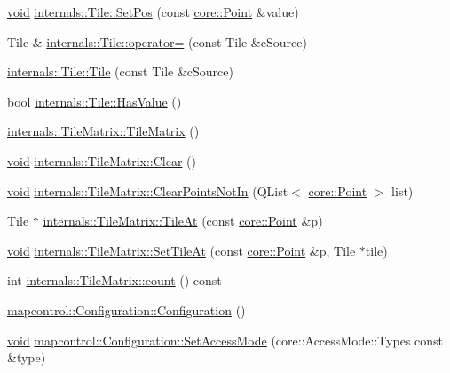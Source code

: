 \begin{DoxyCompactItemize}
\item 
\hyperlink{group___u_a_v_objects_plugin_ga444cf2ff3f0ecbe028adce838d373f5c}{void} \hyperlink{group___o_p_map_widget_gabc58fab03485a97b6d6dbb4982ebf677}{internals\-::\-Tile\-::\-Set\-Pos} (const \hyperlink{structcore_1_1_point}{core\-::\-Point} \&value)
\item 
\-Tile \& \hyperlink{group___o_p_map_widget_ga00b02eca9e95aed841be1192fbd16e74}{internals\-::\-Tile\-::operator=} (const \-Tile \&c\-Source)
\item 
\hyperlink{group___o_p_map_widget_ga18b470118154d71c8f34a805c8bcc782}{internals\-::\-Tile\-::\-Tile} (const \-Tile \&c\-Source)
\item 
bool \hyperlink{group___o_p_map_widget_ga1224388bdb3b16ffe20514aa23ef0687}{internals\-::\-Tile\-::\-Has\-Value} ()
\item 
\hyperlink{group___o_p_map_widget_ga3d1378e5fe1bbfe4113a4ce68aea7859}{internals\-::\-Tile\-Matrix\-::\-Tile\-Matrix} ()
\item 
\hyperlink{group___u_a_v_objects_plugin_ga444cf2ff3f0ecbe028adce838d373f5c}{void} \hyperlink{group___o_p_map_widget_ga77cb176c33480b11c18a63824649e839}{internals\-::\-Tile\-Matrix\-::\-Clear} ()
\item 
\hyperlink{group___u_a_v_objects_plugin_ga444cf2ff3f0ecbe028adce838d373f5c}{void} \hyperlink{group___o_p_map_widget_ga6317ab91209c66759964ba340bd3b980}{internals\-::\-Tile\-Matrix\-::\-Clear\-Points\-Not\-In} (\-Q\-List$<$ \hyperlink{structcore_1_1_point}{core\-::\-Point} $>$ list)
\item 
\-Tile $\ast$ \hyperlink{group___o_p_map_widget_gacf6a186610bc126a6fdd89149f0452e6}{internals\-::\-Tile\-Matrix\-::\-Tile\-At} (const \hyperlink{structcore_1_1_point}{core\-::\-Point} \&p)
\item 
\hyperlink{group___u_a_v_objects_plugin_ga444cf2ff3f0ecbe028adce838d373f5c}{void} \hyperlink{group___o_p_map_widget_gad2d5e21b31c1b3a0420990925a7e6cdc}{internals\-::\-Tile\-Matrix\-::\-Set\-Tile\-At} (const \hyperlink{structcore_1_1_point}{core\-::\-Point} \&p, \-Tile $\ast$tile)
\item 
int \hyperlink{group___o_p_map_widget_gad7ee58d6ccda306fff324d62676aab7a}{internals\-::\-Tile\-Matrix\-::count} () const 
\item 
\hyperlink{group___o_p_map_widget_ga0963ae98b690172299a36a61ee003c21}{mapcontrol\-::\-Configuration\-::\-Configuration} ()
\item 
\hyperlink{group___u_a_v_objects_plugin_ga444cf2ff3f0ecbe028adce838d373f5c}{void} \hyperlink{group___o_p_map_widget_ga41001a3e8948832246f19baf28c45e68}{mapcontrol\-::\-Configuration\-::\-Set\-Access\-Mode} (core\-::\-Access\-Mode\-::\-Types const \&type)

\end{DoxyCompactItemize}
